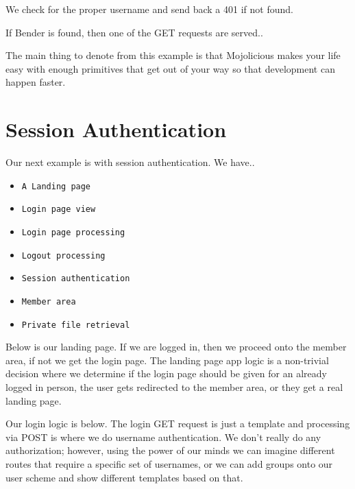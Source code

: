 \documentclass[14pt]{extreport}
\begin{document}
We check for the proper username and send back a 401 if not found.



If Bender is found, then one of the GET requests are served..



The main thing to denote from this example is that Mojolicious makes your life
easy with enough primitives that get out of your way so that development can happen 
faster.

\section{Session Authentication}

Our next example is with session authentication.  We have..

\begin{itemize} \itemsep1pt \parskip0pt 
\item \verb|A Landing page|
\item \verb|Login page view|
\item \verb|Login page processing|
\item \verb|Logout processing|
\item \verb|Session authentication|
\item \verb|Member area|
\item \verb|Private file retrieval|
\end{itemize}

Below is our landing page.  If we are logged in, then we proceed onto the
member area, if not we get the login page.  The landing page app logic is a
non-trivial decision where we determine if the login page should be given for
an already logged in person, the user gets redirected to the member area, or
they get a real landing page.



Our login logic is below.  The login GET request is just a template and
processing via POST is where we do username authentication.  We don't really do
any authorization; however, using the power of our minds we can imagine
different routes that require a specific set of usernames, or we can add groups
onto our user scheme and show different templates based on that.
\end{document}
